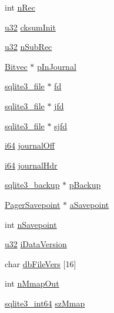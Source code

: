 \begin{DoxyCompactItemize}
\item 
int \hyperlink{struct_pager_a3ef7a597d11c3d959679be103dbf3f21}{n\+Rec}
\item 
\hyperlink{sqlite3_8c_a03ad5adfaeb9b7640dde78a0cc390319}{u32} \hyperlink{struct_pager_aa4040b20ac15e54bf0309036afcb0b09}{cksum\+Init}
\item 
\hyperlink{sqlite3_8c_a03ad5adfaeb9b7640dde78a0cc390319}{u32} \hyperlink{struct_pager_a679e99aa1ded91536e2ddcad98c3e002}{n\+Sub\+Rec}
\item 
\hyperlink{struct_bitvec}{Bitvec} $\ast$ \hyperlink{struct_pager_aa96b10cfc9fc60aa0c349bcaabb9b4bb}{p\+In\+Journal}
\item 
\hyperlink{structsqlite3__file}{sqlite3\+\_\+file} $\ast$ \hyperlink{struct_pager_a4181565f26eda2c718763effefea106b}{fd}
\item 
\hyperlink{structsqlite3__file}{sqlite3\+\_\+file} $\ast$ \hyperlink{struct_pager_a6cf3b74eb6e96a0ec1018a1829fa5a40}{jfd}
\item 
\hyperlink{structsqlite3__file}{sqlite3\+\_\+file} $\ast$ \hyperlink{struct_pager_aab381875115d7de04338ebe1566d0829}{sjfd}
\item 
\hyperlink{sqlite3_8c_a2a0f0f4ae7001eb54351f77ea1cdbcfd}{i64} \hyperlink{struct_pager_af4f5415276d71ec77ce45bb650e04d58}{journal\+Off}
\item 
\hyperlink{sqlite3_8c_a2a0f0f4ae7001eb54351f77ea1cdbcfd}{i64} \hyperlink{struct_pager_af083145c1d130d6c6dc3ed0eaf3683ef}{journal\+Hdr}
\item 
\hyperlink{structsqlite3__backup}{sqlite3\+\_\+backup} $\ast$ \hyperlink{struct_pager_aedd6a6ec27f63296ae65625d51b49f54}{p\+Backup}
\item 
\hyperlink{struct_pager_savepoint}{Pager\+Savepoint} $\ast$ \hyperlink{struct_pager_af464c94c2f39406e429a894bec61ed08}{a\+Savepoint}
\item 
int \hyperlink{struct_pager_a44c5f6cd07e2fa10ce567c1bd86c5189}{n\+Savepoint}
\item 
\hyperlink{sqlite3_8c_a03ad5adfaeb9b7640dde78a0cc390319}{u32} \hyperlink{struct_pager_a3a60e67667c7473065ef0c3a8785c6ea}{i\+Data\+Version}
\item 
char \hyperlink{struct_pager_a836ab610e51a1921192ef051ddb4b3ac}{db\+File\+Vers} \mbox{[}16\mbox{]}
\item 
int \hyperlink{struct_pager_a534c1f10017427734ae2bab8cae2813f}{n\+Mmap\+Out}
\item 
\hyperlink{sqlite3_8c_a0a4d3e6c1ad46f90e746b920ab6ca0d2}{sqlite3\+\_\+int64} \hyperlink{struct_pager_a16be0b65471da845d6b829adf5f17957}{sz\+Mmap}

\end{DoxyCompactItemize}
